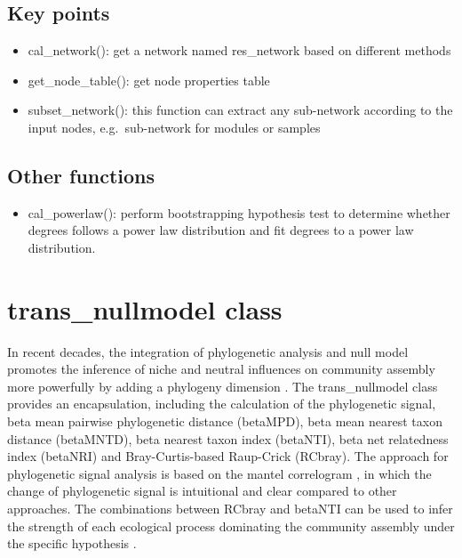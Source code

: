 \documentclass[
]{book}
\providecommand{\tightlist}{%
  \setlength{\itemsep}{0pt}\setlength{\parskip}{0pt}}
\begin{document}
\hypertarget{key-points-6}{%
\subsection{Key points}\label{key-points-6}}

\begin{itemize}
\tightlist
\item
  cal\_network(): get a network named res\_network based on different methods
\item
  get\_node\_table(): get node properties table
\item
  subset\_network(): this function can extract any sub-network according to the input nodes, e.g.~sub-network for modules or samples
\end{itemize}

\hypertarget{other-functions}{%
\subsection{Other functions}\label{other-functions}}

\begin{itemize}
\tightlist
\item
  cal\_powerlaw(): perform bootstrapping hypothesis test to determine whether degrees follows a power law distribution and fit degrees to a power law distribution.
\end{itemize}

\hypertarget{trans_nullmodel-class}{%
\section{trans\_nullmodel class}\label{trans_nullmodel-class}}

In recent decades,
the integration of phylogenetic analysis and null model promotes the inference of niche and neutral influences on community assembly more powerfully
by adding a phylogeny dimension \citep{Webb_Phylogenies_2002, Picante_Kembel_2010, Stegen_Quantifying_2013}.
The trans\_nullmodel class provides an encapsulation, including the calculation of the phylogenetic signal,
beta mean pairwise phylogenetic distance (betaMPD), beta mean nearest taxon distance (betaMNTD),
beta nearest taxon index (betaNTI), beta net relatedness index (betaNRI) and Bray-Curtis-based Raup-Crick (RCbray).
The approach for phylogenetic signal analysis is based on the mantel correlogram \citep{Liu_Long_term_2017},
in which the change of phylogenetic signal is intuitional and clear compared to other approaches.
The combinations between RCbray and betaNTI can be used to infer the strength of each ecological process dominating the community assembly
under the specific hypothesis \citep{Stegen_Quantifying_2013}.
\end{document}
